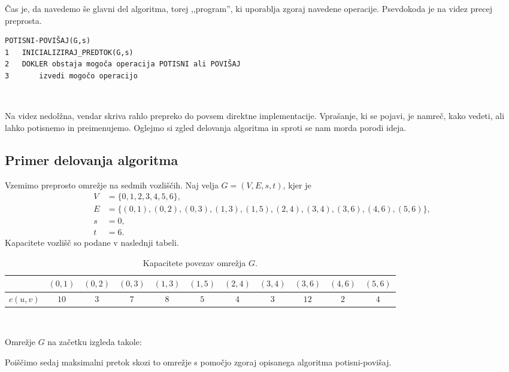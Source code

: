 \documentclass[mat1]{fmfdelo}
\begin{document}
Čas je, da navedemo še glavni del algoritma, torej ,,program'', ki uporablja zgoraj navedene operacije. Psevdokoda je na videz precej preprosta.\\

\begin{verbatim}
POTISNI-POVIŠAJ(G,s)
1   INICIALIZIRAJ_PREDTOK(G,s)
2   DOKLER obstaja mogoča operacija POTISNI ali POVIŠAJ
3       izvedi mogočo operacijo
\end{verbatim}~

Na videz nedolžna, vendar skriva rahlo prepreko do povsem direktne implementacije. Vprašanje, ki se pojavi, je namreč, kako vedeti, ali lahko potisnemo in preimenujemo. Oglejmo si zgled delovanja algoritma in sproti se nam morda porodi ideja.\\

\subsection{Primer delovanja algoritma}

Vzemimo preprosto omrežje na sedmih vozliščih. Naj velja $G = (V, E, s, t)$, kjer je
\begin{align*}
	V &= \{0,1,2,3,4,5,6\},\\
	E &= \{(0,1), (0,2), (0,3), (1,3), (1,5), (2,4), (3,4), (3,6), (4,6), (5,6)\},\\
	s &= 0,\\
	t &= 6.
\end{align*}
Kapacitete vozlišč so podane v naslednji tabeli.

\begin{table}[h!]
\centering
\caption{Kapacitete povezav omrežja $G$.}
\begin{tabular}{|l|c|c|c|c|c|c|c|c|c|c|}
\hline
& $(0,1)$ & $(0,2)$ & $(0,3)$ & $(1,3)$ & $(1,5)$ & $(2,4)$ & $(3,4)$ & $(3,6)$ & $(4,6)$ & $(5,6)$\\ \hline
$c(u,v)$ & $10$ & $3$ & $7$ & $8$ & $5$ & $4$ & $3$ & $12$ & $2$ & $4$\\
\hline
\end{tabular}
\end{table}~

Omrežje $G$ na začetku izgleda takole:


Poiščimo sedaj maksimalni pretok skozi to omrežje s pomočjo zgoraj opisanega algoritma potisni-povišaj.\\
\end{document}
